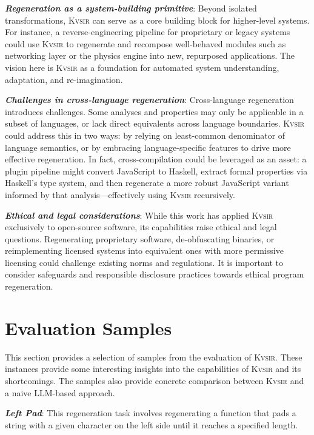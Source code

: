 \documentclass[nonacm,sigplan,review]{acmart}
\newcommand{\sys}{{\scshape Kv{\textalpha}sir}\xspace}
\newcommand{\heading}[1]{\vspace{2pt}\noindent\textbf{\emph{#1}}:\enspace}
\begin{document}
\heading{Regeneration as a system-building primitive}
Beyond isolated transformations, \sys can serve as a core building block for
higher-level systems.
For instance, a reverse-engineering pipeline for
proprietary or legacy systems could use \sys to regenerate and recompose
well-behaved modules such as networking layer or the physics engine into new,
repurposed applications.
The vision here is \sys as a foundation for automated system understanding, adaptation, and re-imagination.

\heading{Challenges in cross-language regeneration}
Cross-language regeneration introduces challenges.
Some analyses and
properties may only be applicable in a subset of languages, or lack direct
equivalents across language boundaries.
\sys could address this in two ways: by
relying on least-common denominator of language semantics, or by
embracing language-specific features to drive more effective regeneration.
In
fact, cross-compilation could be leveraged as an asset: a plugin pipeline might
convert JavaScript to Haskell, extract formal properties via Haskell’s type
system, and then regenerate a more robust JavaScript variant informed by that
analysis---effectively using \sys recursively.

\heading{Ethical and legal considerations}
While this work has applied \sys exclusively to open-source software, its
capabilities raise ethical and legal questions. Regenerating
proprietary software, de-obfuscating binaries, or reimplementing licensed
systems into equivalent ones with more permissive licensing 
could challenge existing norms and
regulations. 
It is important to consider
safeguards and responsible disclosure practices towards ethical program regeneration.




\appendix

\section{Evaluation Samples}
This section provides a selection of samples from the evaluation of \sys.
These instances provide some interesting insights into the capabilities of \sys and its shortcomings.
The samples also provide concrete comparison between \sys and a naive LLM-based approach.

\heading{Left Pad}
This regeneration task involves regenerating a
function that pads a string with a given character on the left side until it
reaches a specified length.
\end{document}
